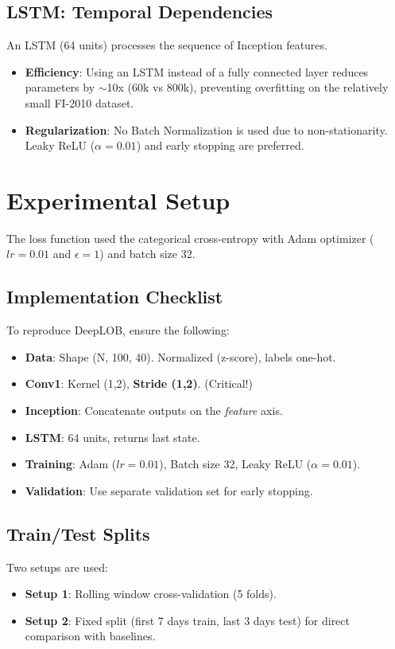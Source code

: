 \documentclass[10pt]{article}
\begin{document}
\subsection{LSTM: Temporal Dependencies}
An LSTM (64 units) processes the sequence of Inception features.
\begin{itemize}
    \item \textbf{Efficiency}: Using an LSTM instead of a fully connected layer reduces parameters by $\sim$10x (60k vs 800k), preventing overfitting on the relatively small FI-2010 dataset.
    \item \textbf{Regularization}: No Batch Normalization is used due to non-stationarity. Leaky ReLU ($\alpha=0.01$) and early stopping are preferred.
\end{itemize}

\section{Experimental Setup}

The loss function used the categorical cross-entropy with Adam optimizer ($lr=0.01$ and $\epsilon=1$) and batch size 32.

\subsection{Implementation Checklist}
To reproduce DeepLOB, ensure the following:
\begin{itemize}[label=$\square$]
    \item \textbf{Data}: Shape (N, 100, 40). Normalized (z-score), labels one-hot.
    \item \textbf{Conv1}: Kernel (1,2), \textbf{Stride (1,2)}. (Critical!)
    \item \textbf{Inception}: Concatenate outputs on the \textit{feature} axis.
    \item \textbf{LSTM}: 64 units, returns last state.
    \item \textbf{Training}: Adam ($lr=0.01$), Batch size 32, Leaky ReLU ($\alpha=0.01$).
    \item \textbf{Validation}: Use separate validation set for early stopping.
\end{itemize}

\subsection{Train/Test Splits}
Two setups are used:
\begin{itemize}
    \item \textbf{Setup 1}: Rolling window cross-validation (5 folds).
    \item \textbf{Setup 2}: Fixed split (first 7 days train, last 3 days test) for direct comparison with baselines.
\end{itemize}
\end{document}

